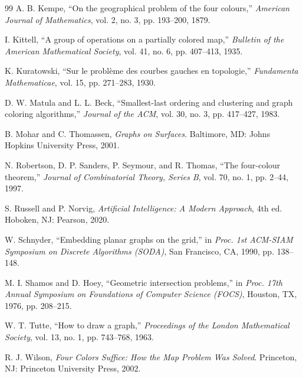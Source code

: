 \documentclass[12pt,letterpaper]{article}
\theoremstyle{plain}
\theoremstyle{definition}
\theoremstyle{remark}
\begin{document}
\begin{thebibliography}{99}
A. B. Kempe,
``On the geographical problem of the four colours,''
\textit{American Journal of Mathematics}, vol. 2, no. 3, pp. 193--200, 1879.

I. Kittell,
``A group of operations on a partially colored map,''
\textit{Bulletin of the American Mathematical Society}, vol. 41, no. 6,
pp. 407--413, 1935.

K. Kuratowski,
``Sur le probl\`eme des courbes gauches en topologie,''
\textit{Fundamenta Mathematicae}, vol. 15, pp. 271--283, 1930.

D. W. Matula and L. L. Beck,
``Smallest-last ordering and clustering and graph coloring algorithms,''
\textit{Journal of the ACM}, vol. 30, no. 3, pp. 417--427, 1983.

B. Mohar and C. Thomassen,
\textit{Graphs on Surfaces}.
Baltimore, MD: Johns Hopkins University Press, 2001.

N. Robertson, D. P. Sanders, P. Seymour, and R. Thomas,
``The four-colour theorem,''
\textit{Journal of Combinatorial Theory, Series B}, vol. 70, no. 1,
pp. 2--44, 1997.

S. Russell and P. Norvig,
\textit{Artificial Intelligence: A Modern Approach}, 4th ed.
Hoboken, NJ: Pearson, 2020.

W. Schnyder,
``Embedding planar graphs on the grid,''
in \textit{Proc. 1st ACM-SIAM Symposium on Discrete Algorithms (SODA)},
San Francisco, CA, 1990, pp. 138--148.

M. I. Shamos and D. Hoey,
``Geometric intersection problems,''
in \textit{Proc. 17th Annual Symposium on Foundations of Computer Science (FOCS)},
Houston, TX, 1976, pp. 208--215.

W. T. Tutte,
``How to draw a graph,''
\textit{Proceedings of the London Mathematical Society}, vol. 13, no. 1,
pp. 743--768, 1963.

R. J. Wilson,
\textit{Four Colors Suffice: How the Map Problem Was Solved}.
Princeton, NJ: Princeton University Press, 2002.

\end{thebibliography}
\end{document}
